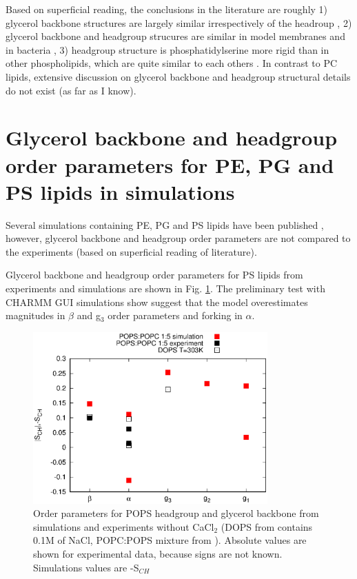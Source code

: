\documentclass[aps,prl,superscriptaddress,twocolumn]{revtex4}
\begin{document}
Based on superficial reading, the conclusions in the literature are roughly
1) glycerol backbone structures are largely similar irrespectively of the headroup \cite{gally81},
2) glycerol backbone and headgroup strucures are similar in model membranes and in bacteria \cite{gally81,??},
3) headgroup structure is phosphatidylserine more rigid than in other phospholipids, which are quite similar to
each others \cite{??}.
In contrast to PC lipids, extensive discussion on glycerol backbone and headgroup structural details do not
exist (as far as I know).

\section{Glycerol backbone and headgroup order parameters for PE, PG and PS lipids in simulations}

Several simulations containing PE, PG and PS lipids have been published \cite{??},
however, glycerol backbone and headgroup order parameters are not compared to
the experiments (based on superficial reading of literature).

Glycerol backbone and headgroup order parameters for PS lipids from experiments
and simulations are shown in Fig. \ref{HGorderParametersPOPS}.
The preliminary test with CHARMM GUI simulations show suggest that the model
overestimates magnitudes in $\beta$ and g$_3$ order parameters and forking in $\alpha$.
\begin{figure}[]
  \centering
  \includegraphics[width=9.0cm]{../Figs/HGorderparametersPOPS.eps}
  \caption{\label{HGorderParametersPOPS}
    Order parameters for POPS headgroup and glycerol backbone from simulations and experiments without CaCl$_2$ 
    (DOPS from \cite{browning80} contains 0.1M of NaCl, POPC:POPS mixture from \cite{roux90}).
    Absolute values are shown for experimental data, because signs are not known.
    Simulations values are -S$_{CH}$
  }
\end{figure}
\end{document}

